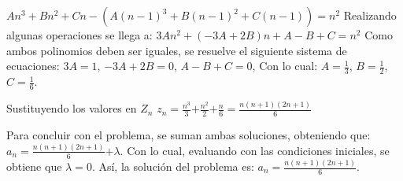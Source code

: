 \documentclass{article}
\begin{document}
$An^3+Bn^2+Cn-(A(n-1)^3+B(n-1)^2+C(n-1))=n^2$
Realizando algunas operaciones se llega a:
$3An^2+(-3A+2B)n+A-B+C=n^2$
Como ambos polinomios deben ser iguales, se resuelve el siguiente sistema de ecuaciones:
$3A=1$,
$-3A+2B=0$,
$A-B+C=0$,
Con lo cual: $A=\frac{1}{3}$, $B=\frac{1}{2}$, $C=\frac{1}{6}$.

Sustituyendo los valores en $Z_n$
$z_n=\frac{n^3}{3}$$+\frac{n^2}{2}$$+\frac{n}{6}=$$\frac{n(n+1)(2n+1)}{6}$

Para concluir con el problema, se suman ambas soluciones, obteniendo que:
$a_n=\frac{n(n+1)(2n+1)}{6}$$+\lambda$.
Con lo cual, evaluando con las condiciones iniciales, se obtiene que $\lambda$$=0$.
Así, la solución del problema es:
$a_n=\frac{n(n+1)(2n+1)}{6}$.
\end{document}
